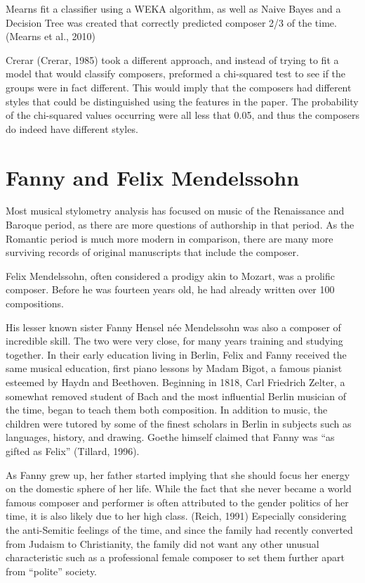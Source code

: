 \documentclass[12pt,twoside]{reedthesis}
\theoremstyle{definition}
\theoremstyle{definition}
\theoremstyle{definition}
\theoremstyle{remark}
\begin{document}
Mearns fit a classifier using a WEKA algorithm, as well as Naive Bayes
and a Decision Tree was created that correctly predicted composer 2/3 of
the time. (Mearns et al., 2010)

Crerar (Crerar, 1985) took a different approach, and instead of trying
to fit a model that would classify composers, preformed a chi-squared
test to see if the groups were in fact different. This would imply that
the composers had different styles that could be distinguished using the
features in the paper. The probability of the chi-squared values
occurring were all less that 0.05, and thus the composers do indeed have
different styles.

\section{Fanny and Felix Mendelssohn}\label{fanny-and-felix-mendelssohn}

Most musical stylometry analysis has focused on music of the Renaissance
and Baroque period, as there are more questions of authorship in that
period. As the Romantic period is much more modern in comparison, there
are many more surviving records of original manuscripts that include the
composer.

Felix Mendelssohn, often considered a prodigy akin to Mozart, was a
prolific composer. Before he was fourteen years old, he had already
written over 100 compositions.

His lesser known sister Fanny Hensel née Mendelssohn was also a composer
of incredible skill. The two were very close, for many years training
and studying together. In their early education living in Berlin, Felix
and Fanny received the same musical education, first piano lessons by
Madam Bigot, a famous pianist esteemed by Haydn and Beethoven. Beginning
in 1818, Carl Friedrich Zelter, a somewhat removed student of Bach and
the most influential Berlin musician of the time, began to teach them
both composition. In addition to music, the children were tutored by
some of the finest scholars in Berlin in subjects such as languages,
history, and drawing. Goethe himself claimed that Fanny was ``as gifted
as Felix'' (Tillard, 1996).

As Fanny grew up, her father started implying that she should focus her
energy on the domestic sphere of her life. While the fact that she never
became a world famous composer and performer is often attributed to the
gender politics of her time, it is also likely due to her high class.
(Reich, 1991) Especially considering the anti-Semitic feelings of the
time, and since the family had recently converted from Judaism to
Christianity, the family did not want any other unusual characteristic
such as a professional female composer to set them further apart from
``polite'' society.
\end{document}
